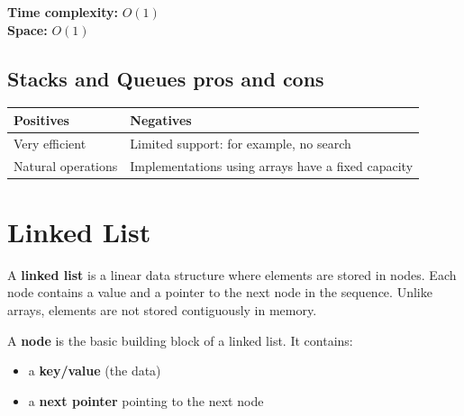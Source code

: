 \documentclass[11pt,a4paper,openany]{book}
\begin{document}
\textbf{Time complexity:} $O(1)$ \\

\textbf{Space:} $O(1)$














\vspace{2cm}


\section{Stacks and Queues pros and cons}

\begin{tabular}{|p{6cm}|p{8cm}|}
\hline
\textbf{Positives} & \textbf{Negatives} \\
\hline
Very efficient &
Limited support: for example, no search \\
\hline
Natural operations &
Implementations using arrays have a fixed capacity \\
\hline
\end{tabular}





\vspace{2cm}








\chapter{Linked List}

\begin{defnbox}[title=Linked List]
A \textbf{linked list} is a linear data structure where elements are stored in nodes.  
Each node contains a value and a pointer to the next node in the sequence.  
Unlike arrays, elements are not stored contiguously in memory.
\end{defnbox}

\begin{defnbox}[title=Node]
A \textbf{node} is the basic building block of a linked list.  
It contains:
\begin{itemize}
    \item a \textbf{key/value} (the data)
    \item a \textbf{next pointer} pointing to the next node
\end{itemize}
\end{defnbox}
\end{document}
